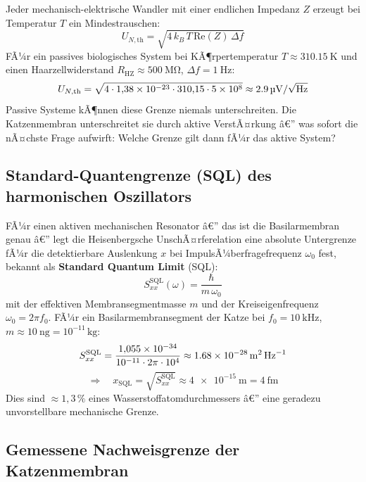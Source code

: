 ﻿\documentclass[12pt,a4paper,titlepage]{report}
\begin{document}
Jeder mechanisch-elektrische Wandler mit einer endlichen Impedanz $Z$ erzeugt
bei Temperatur $T$ ein Mindestrauschen:
\[
  U_{N,\text{th}} = \sqrt{4\,k_B\,T\,\mathrm{Re}(Z)\,\Delta f}
\]
FÃ¼r ein passives biologisches System bei KÃ¶rpertemperatur
$T \approx \SI{310.15}{\kelvin}$ und einen Haarzellwiderstand
$R_{\text{HZ}} \approx \SI{500}{\mega\ohm}$, $\Delta f = \SI{1}{\hertz}$:
\[
  U_{N,\text{th}} = \sqrt{4 \cdot 1{,}38\times10^{-23} \cdot 310{,}15 \cdot 5\times10^8}
  \approx \SI{2{,}9}{\micro\volt\per\sqrt{\hertz}}
\]
Passive Systeme kÃ¶nnen diese Grenze niemals unterschreiten.
Die Katzenmembran unterschreitet sie durch aktive VerstÃ¤rkung â€” was sofort die
nÃ¤chste Frage aufwirft: Welche Grenze gilt dann fÃ¼r das aktive System?

\subsection{Standard-Quantengrenze (SQL) des harmonischen Oszillators}

FÃ¼r einen aktiven mechanischen Resonator â€” das ist die Basilarmembran genau â€”
legt die Heisenbergsche UnschÃ¤rferelation eine absolute Untergrenze fÃ¼r die
detektierbare Auslenkung $x$ bei ImpulsÃ¼berfragefrequenz $\omega_0$ fest,
bekannt als \textbf{Standard Quantum Limit} (SQL):
\[
  S_{xx}^{\mathrm{SQL}}(\omega) = \frac{\hbar}{m\,\omega_0}
\]
mit der effektiven Membransegmentmasse $m$ und der Kreiseigenfrequenz
$\omega_0 = 2\pi f_0$.
FÃ¼r ein Basilarmembransegment der Katze bei $f_0 = \SI{10}{\kilo\hertz}$,
$m \approx \SI{10}{\nano\gram} = 10^{-11}\,\text{kg}$:
\[
  S_{xx}^{\mathrm{SQL}}
  = \frac{1{,}055\times10^{-34}}{10^{-11}\cdot 2\pi\cdot 10^4}
  \approx \SI{1{,}68e-28}{\meter\squared\per\hertz}
\]
\[
  \Rightarrow\quad x_{\mathrm{SQL}} = \sqrt{S_{xx}^{\mathrm{SQL}}}
  \approx \SI{4e-15}{\meter} = \SI{4}{\femto\meter}
\]
Dies sind $\approx 1{,}3\,\%$ eines Wasserstoffatomdurchmessers â€” eine geradezu
unvorstellbare mechanische Grenze.

\subsection{Gemessene Nachweisgrenze der Katzenmembran}
\end{document}
